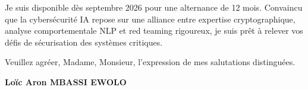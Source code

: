 \documentclass[a4paper,11pt]{article}
\begin{document}
\vspace{0.8em}
Je suis disponible dès septembre 2026 pour une alternance de 12 mois. Convaincu que la cybersécurité IA repose sur une alliance entre expertise cryptographique, analyse comportementale NLP et red teaming rigoureux, je suis prêt à relever vos défis de sécurisation des systèmes critiques.

\vspace{1.5em}
\noindent Veuillez agréer, Madame, Monsieur, l'expression de mes salutations distinguées.

\vspace{2em}
\noindent \textbf{Loïc Aron MBASSI EWOLO}
\end{document}
